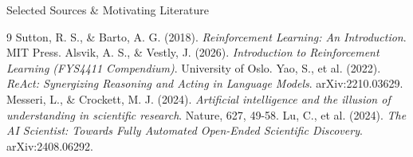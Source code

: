 \documentclass[10pt, aspectratio=169]{beamer}
\begin{document}
\begin{frame}{Selected Sources \& Motivating Literature}
  \begin{thebibliography}{9}
     Sutton, R. S., \& Barto, A. G. (2018). \textit{Reinforcement Learning: An Introduction}. MIT Press.
     Alsvik, A. S., \& Vestly, J. (2026). \textit{Introduction to Reinforcement Learning (FYS4411 Compendium)}. University of Oslo.
     Yao, S., et al. (2022). \textit{ReAct: Synergizing Reasoning and Acting in Language Models}. arXiv:2210.03629.
     Messeri, L., \& Crockett, M. J. (2024). \textit{Artificial intelligence and the illusion of understanding in scientific research}. Nature, 627, 49-58.
     Lu, C., et al. (2024). \textit{The AI Scientist: Towards Fully Automated Open-Ended Scientific Discovery}. arXiv:2408.06292.
  \end{thebibliography}
\end{frame}
\end{document}
